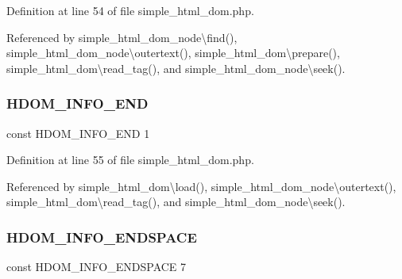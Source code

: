 Definition at line 54 of file simple\+\_\+html\+\_\+dom.\+php.



Referenced by simple\+\_\+html\+\_\+dom\+\_\+node\textbackslash{}find(), simple\+\_\+html\+\_\+dom\+\_\+node\textbackslash{}outertext(), simple\+\_\+html\+\_\+dom\textbackslash{}prepare(), simple\+\_\+html\+\_\+dom\textbackslash{}read\+\_\+tag(), and simple\+\_\+html\+\_\+dom\+\_\+node\textbackslash{}seek().

\hypertarget{simple__html__dom_8php_adeab85900893208119e3d1f2b3e2fca1}{}\label{simple__html__dom_8php_adeab85900893208119e3d1f2b3e2fca1} 
\subsubsection{\texorpdfstring{H\+D\+O\+M\+\_\+\+I\+N\+F\+O\+\_\+\+E\+ND}{HDOM\_INFO\_END}}
{\footnotesize\ttfamily const H\+D\+O\+M\+\_\+\+I\+N\+F\+O\+\_\+\+E\+ND 1}



Definition at line 55 of file simple\+\_\+html\+\_\+dom.\+php.



Referenced by simple\+\_\+html\+\_\+dom\textbackslash{}load(), simple\+\_\+html\+\_\+dom\+\_\+node\textbackslash{}outertext(), simple\+\_\+html\+\_\+dom\textbackslash{}read\+\_\+tag(), and simple\+\_\+html\+\_\+dom\+\_\+node\textbackslash{}seek().

\hypertarget{simple__html__dom_8php_a45cce2cf42d5ed669087cad509c1476c}{}\label{simple__html__dom_8php_a45cce2cf42d5ed669087cad509c1476c} 
\subsubsection{\texorpdfstring{H\+D\+O\+M\+\_\+\+I\+N\+F\+O\+\_\+\+E\+N\+D\+S\+P\+A\+CE}{HDOM\_INFO\_ENDSPACE}}
{\footnotesize\ttfamily const H\+D\+O\+M\+\_\+\+I\+N\+F\+O\+\_\+\+E\+N\+D\+S\+P\+A\+CE 7}



